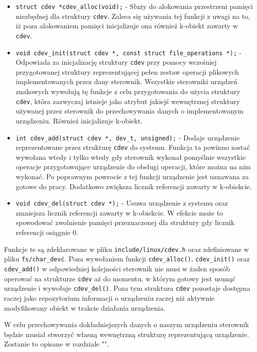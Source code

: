 \documentclass[10pt]{article}
\begin{document}
\begin{itemize}
\item
  \texttt{struct cdev *cdev\_alloc(void);} - Służy do alokowania przestrzeni pamięci niezbędnej dla struktury \texttt{cdev}. Zaleca się używania tej funkcji z uwagi na to, iż poza alokowaniem pamięci inicjalizuje ona również k-obiekt zawarty w \texttt{cdev}.
\item
  \texttt{void cdev\_init(struct cdev *, const struct file\_operations *);} - Odpowiada za inicjalizację struktury \texttt{cdev} przy pomocy wcześniej przygotowanej struktury reprezentującej pełen zestaw operacji plikowych implementowanych przez dany sterownik. Wszystkie sterowniki urządzeń znakowych wywołują tę funkcje z celu przygotowania do użycia struktury \texttt{cdev}, która zazwyczaj istnieje jako atrybut jakiejś wewnętrznej struktury używanej przez sterownik do przechowywania danych o implementowanym urządzeniu. Również inicjalizuje k-obiekt.
\item
  \texttt{int cdev\_add(struct cdev *, dev\_t, unsigned);} - Dodaje urządzenie reprezentowane przez strukturę \texttt{cdev} do systemu.  Funkcja ta powinno zostać wywołana wtedy i tylko wtedy gdy sterownik wykonał pomyślnie wszystkie operacje przygotowujące urządzenie do obsługi operacji, które można na nim wykonać. Po poprawnym powrocie z tej funkcji urządzenie jest uznawana za gotowe do pracy. Dodatkowo zwiększa licznik referencji zawarty w k-obiekcie.
\item
  \texttt{void cdev\_del(struct cdev *);} - Usuwa urządzenie z systemu oraz zmniejsza licznik referencji zawarty w k-obiekcie. W efekcie może to spowodować zwolnienie pamięci przeznaczonej dla struktury gdy licznik referencji osiągnie 0.
\end{itemize}

Funkcje te są zdeklarowane w pliku \texttt{include/linux/cdev.h} oraz zdefiniowane w pliku \texttt{fs/char\_dev\.c}. Poza wywołaniem funkcji \texttt{cdev\_alloc()}, \texttt{cdev\_init()} oraz \texttt{cdev\_add()} w odpowiedniej kolejności sterownik nie musi w żaden sposób operować na strukturze \texttt{cdev} aż do momentu, w którym gotowy jest usunąć urządzenie i wywołuje \texttt{cdev\_del()}. Poza tym struktura \texttt{cdev} pozostaje dostępna raczej jako repozytorium informacji o urządzeniu raczej niż aktywnie modyfikowany obiekt w trakcie działania urządzenia.

W celu przechowywania dokładniejszych danych o naszym urządzeniu sterownik będzie musiał stworzyć własną wewnętrzną strukturę reprezentującą urządzenie. Zostanie to opisane w rozdziale "".
\end{document}
